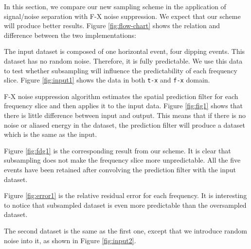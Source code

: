 \par
In this section, we compare our new sampling scheme in the application of 
signal/noise separation with F-X noise suppression. We expect that our scheme 
will produce better results. Figure \ref{fig:flow-chart} shows the relation and 
difference between the two implementations:

\par
The input dataset is composed of one horizontal event, four dipping events.
This dataset has no random noise. Therefore, it is fully predictable. 
We use this data to test whether subsampling will influence the predictability 
of each frequency slice. Figure \ref{fig:input1} shows the data
in both {\tt t-x} and {\tt f-x} domain.  


\par
F-X noise suppression algorithm estimates the spatial prediction filter for 
each frequency slice and then applies it to the input data. 
Figure \ref{fig:fig1} shows that there is little difference 
between input and output. This means that if there is no noise or aliased 
energy in the dataset, the prediction filter will produce a dataset which is 
the same as the input.

\par
Figure \ref{fig:fdg1} is the corresponding result from our scheme. It is clear 
that subsampling does not make the frequency slice more unpredictable. All 
the five events have been retained after convolving the prediction filter with 
the input dataset.

Figure \ref{fig:error1} is the relative residual error for each frequency. 
It is interesting to notice that subsampled dataset is even more predictable 
than the oversampled dataset. 

\par
The second dataset is the same as the first one, except that we introduce 
random noise into it, as shown in Figure \ref{fig:input2}. 

